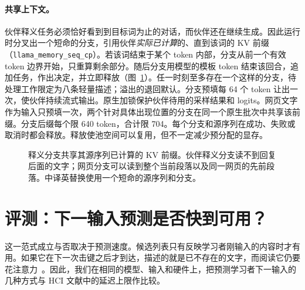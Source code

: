 \documentclass[11pt,a4paper,fontset=windows]{ctexart}
\newcommand{\code}[1]{\texttt{#1}}
\begin{document}
\paragraph{共享上下文。}伙伴释义任务必须恰好看到到目标词为止的对话，而伙伴还在继续生成。因此运行时分叉出一个短命的分支，引用伙伴\emph{实际已计算}的、直到该词的 KV 前缀（\code{llama\_memory\_seq\_cp}）。若该词结束于某个 token 内部，分支从前一个有效 token 边界开始，只重算剩余部分。随后分支用模型的模板 token 结束该回合，追加任务，作出决定，并立即释放（图~\ref{fig:architecture}）。任一时刻至多存在一个这样的分支，待处理工作限定为八条轻量描述；溢出的退回默认。分支预填每 64 个 token 让出一次，使伙伴持续流式输出。原生加锁保护伙伴待用的采样结果和 logits。网页文字作为输入只预填一次，两个针对具体出现位置的分支在同一个原生批次中共享该前缀。分支后缀每个限 640 token，合计限 704。每个分支和源序列在成功、失败或取消时都会释放。释放使池空间可以复用，但不一定减少预分配的显存。

\begin{figure}[ht]
\centering
{}
\caption{释义分支共享其源序列已计算的 KV 前缀。伙伴释义分支读不到回复后面的文字；网页分支可以读到整个当前段落以及同一网页的先前段落。中译英替换使用一个短命的源序列和分支。}
\label{fig:architecture}
\end{figure}

\section{评测：下一输入预测是否快到可用？}
\label{sec:results}
这一范式成立与否取决于预测速度。候选列表只有反映学习者刚输入的内容时才有用。如果它在下一次击键之后才到达，描述的就是已不存在的文字，而阅读它仍要花注意力~\cite{quinn}。因此，我们在相同的模型、输入和硬件上，把预测学习者下一输入的几种方式与 HCI 文献中的延迟上限作比较。
\end{document}
